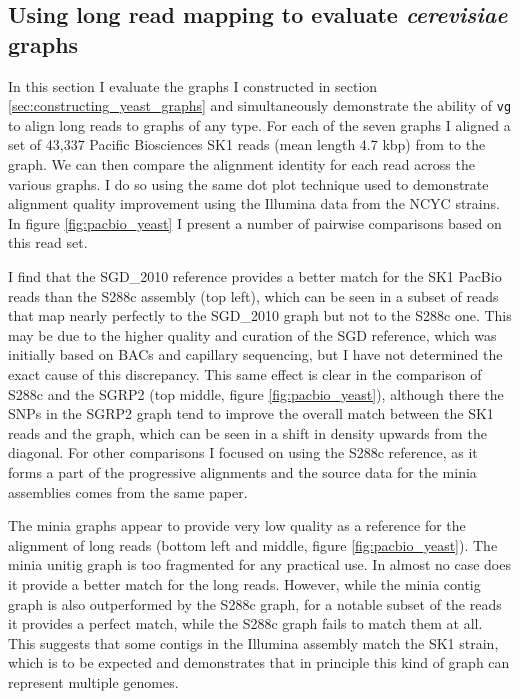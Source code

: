 \documentclass[a4paper,12pt,numbered,oneside]{Classes/PhDThesisPSnPDF}
\begin{document}
\subsection{Using long read mapping to evaluate \emph{cerevisiae} graphs} %
\label{sec:yeast_long_read}

In this section I evaluate the graphs I constructed in section \ref{sec:constructing_yeast_graphs} and simultaneously demonstrate the ability of {\tt vg} to align long reads to graphs of any type.
For each of the seven graphs I aligned a set of 43,337 Pacific Biosciences SK1 reads (mean length 4.7 kbp) from \cite{yue2017contrasting} to the graph.
We can then compare the alignment identity for each read across the various graphs.
I do so using the same dot plot technique used to demonstrate alignment quality improvement using the Illumina data from the NCYC strains.
In figure \ref{fig:pacbio_yeast} I present a number of pairwise comparisons based on this read set.

I find that the SGD\_2010 reference provides a better match for the SK1 PacBio reads than the S288c assembly (top left), which can be seen in a subset of reads that map nearly perfectly to the SGD\_2010 graph but not to the S288c one.
This may be due to the higher quality and curation of the SGD reference, which was initially based on BACs and capillary sequencing, but I have not determined the exact cause of this discrepancy.
This same effect is clear in the comparison of S288c and the SGRP2 (top middle, figure \ref{fig:pacbio_yeast}), although there the SNPs in the SGRP2 graph tend to improve the overall match between the SK1 reads and the graph, which can be seen in a shift in density upwards from the diagonal.
For other comparisons I focused on using the S288c reference, as it forms a part of the progressive alignments and the source data for the minia assemblies comes from the same paper.

The minia graphs appear to provide very low quality as a reference for the alignment of long reads (bottom left and middle, figure \ref{fig:pacbio_yeast}).
The minia unitig graph is too fragmented for any practical use.
In almost no case does it provide a better match for the long reads.
However, while the minia contig graph is also outperformed by the S288c graph, for a notable subset of the reads it provides a perfect match, while the S288c graph fails to match them at all.
This suggests that some contigs in the Illumina assembly match the SK1 strain, which is to be expected and demonstrates that in principle this kind of graph can represent multiple genomes.
\end{document}
